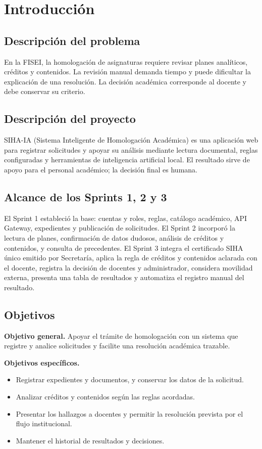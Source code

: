 \section{Introducción}
\subsection{Descripción del problema}
En la FISEI, la homologación de asignaturas requiere revisar planes analíticos, créditos y contenidos. La revisión manual demanda tiempo y puede dificultar la explicación de una resolución. La decisión académica corresponde al docente y debe conservar su criterio.

\subsection{Descripción del proyecto}
SIHA-IA (Sistema Inteligente de Homologación Académica) es una aplicación web para registrar solicitudes y apoyar su análisis mediante lectura documental, reglas configuradas y herramientas de inteligencia artificial local. El resultado sirve de apoyo para el personal académico; la decisión final es humana.

\subsection{Alcance de los Sprints 1, 2 y 3}
El Sprint 1 estableció la base: cuentas y roles, reglas, catálogo académico, API Gateway, expedientes y publicación de solicitudes. El Sprint 2 incorporó la lectura de planes, confirmación de datos dudosos, análisis de créditos y contenidos, y consulta de precedentes. El Sprint 3 integra el certificado SIHA único emitido por Secretaría, aplica la regla de créditos y contenidos aclarada con el docente, registra la decisión de docentes y administrador, considera movilidad externa, presenta una tabla de resultados y automatiza el registro manual del resultado.

\subsection{Objetivos}
\textbf{Objetivo general.} Apoyar el trámite de homologación con un sistema que registre y analice solicitudes y facilite una resolución académica trazable.

\textbf{Objetivos específicos.}
\begin{itemize}
\item Registrar expedientes y documentos, y conservar los datos de la solicitud.
\item Analizar créditos y contenidos según las reglas acordadas.
\item Presentar los hallazgos a docentes y permitir la resolución prevista por el flujo institucional.
\item Mantener el historial de resultados y decisiones.
\end{itemize}

